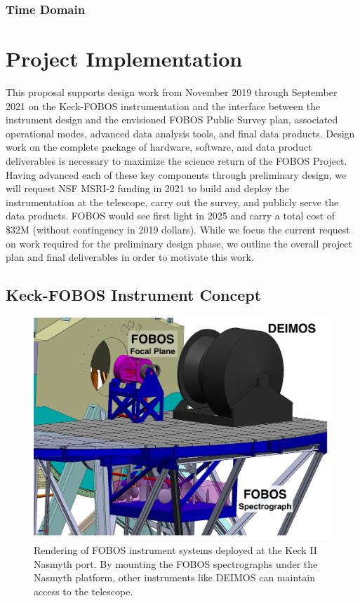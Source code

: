 \documentclass[oneside,11pt]{amsart}
\newcommand{\comment}[2][todo]{{\color{#1}[[{\bf #2}]]}}
\begin{document}
\subsubsection{Time Domain}
\label{sec:timedomain}
\noindent \comment{1/2 page}



\section{Project Implementation}
\label{sec:project}

This proposal supports design work from November 2019 through September 2021 on the Keck-FOBOS instrumentation and the
interface between the instrument design and the envisioned FOBOS Public Survey plan, associated operational modes,
advanced data analysis tools, and final data products.  Design work on the complete package of hardware, software, and
data product deliverables is necessary to maximize the science return of the FOBOS Project.  Having advanced each of
these key components through preliminary design, we will request NSF MSRI-2 funding in 2021 to build and deploy the
instrumentation at the telescope, carry out the survey, and publicly serve the data products.  FOBOS would see first
light in 2025 and carry a total cost of \$32M (without contingency in 2019 dollars).  While we focus the current
request on work required for the preliminary design phase, we outline the overall project plan and final deliverables
in order to motivate this work.

\subsection{Keck-FOBOS Instrument Concept}
\label{sec:concept}
\noindent \comment{1 page}

\begin{figure}[h!]
 \vskip -0.1in
 \includegraphics[width=\textwidth]{FOBOSatKeck_v1.pdf}
 \caption{\small Rendering of FOBOS instrument systems deployed at the Keck II Nasmyth port.  By mounting the FOBOS spectrographs under the Nasmyth platform, other instruments like DEIMOS can maintain access to the telescope.}\label{fig:layout}
\end{figure}
\end{document}
